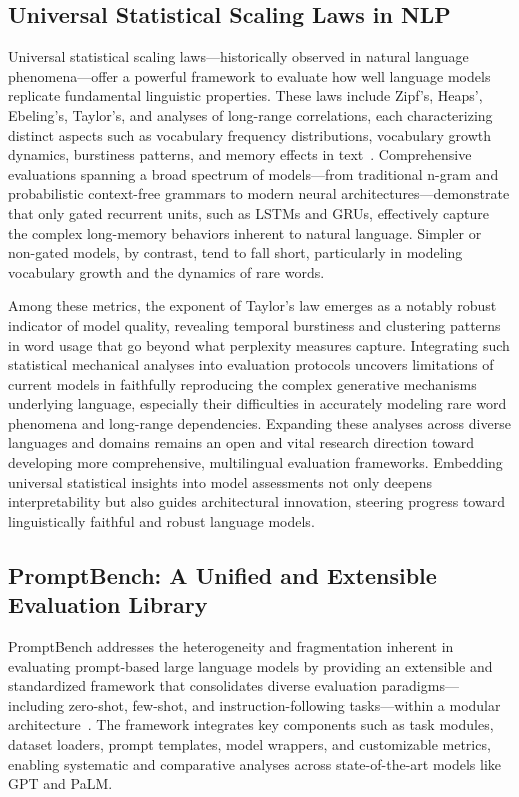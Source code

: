 \documentclass[sigconf]{acmart}
\begin{document}
\subsection{Universal Statistical Scaling Laws in NLP}

Universal statistical scaling laws—historically observed in natural language phenomena—offer a powerful framework to evaluate how well language models replicate fundamental linguistic properties. These laws include Zipf’s, Heaps’, Ebeling’s, Taylor’s, and analyses of long-range correlations, each characterizing distinct aspects such as vocabulary frequency distributions, vocabulary growth dynamics, burstiness patterns, and memory effects in text~\cite{ref51}. Comprehensive evaluations spanning a broad spectrum of models—from traditional n-gram and probabilistic context-free grammars to modern neural architectures—demonstrate that only gated recurrent units, such as LSTMs and GRUs, effectively capture the complex long-memory behaviors inherent to natural language. Simpler or non-gated models, by contrast, tend to fall short, particularly in modeling vocabulary growth and the dynamics of rare words.

Among these metrics, the exponent of Taylor’s law emerges as a notably robust indicator of model quality, revealing temporal burstiness and clustering patterns in word usage that go beyond what perplexity measures capture. Integrating such statistical mechanical analyses into evaluation protocols uncovers limitations of current models in faithfully reproducing the complex generative mechanisms underlying language, especially their difficulties in accurately modeling rare word phenomena and long-range dependencies. Expanding these analyses across diverse languages and domains remains an open and vital research direction toward developing more comprehensive, multilingual evaluation frameworks. Embedding universal statistical insights into model assessments not only deepens interpretability but also guides architectural innovation, steering progress toward linguistically faithful and robust language models.

\subsection{PromptBench: A Unified and Extensible Evaluation Library}

PromptBench addresses the heterogeneity and fragmentation inherent in evaluating prompt-based large language models by providing an extensible and standardized framework that consolidates diverse evaluation paradigms—including zero-shot, few-shot, and instruction-following tasks—within a modular architecture~\cite{ref6}. The framework integrates key components such as task modules, dataset loaders, prompt templates, model wrappers, and customizable metrics, enabling systematic and comparative analyses across state-of-the-art models like GPT and PaLM.
\end{document}
